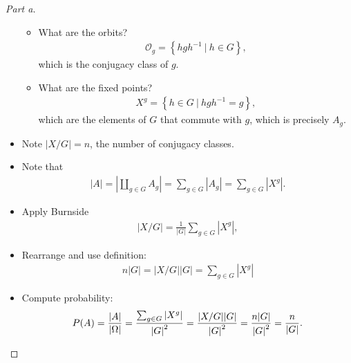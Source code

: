 \begin{solution}
\begin{proof}[Part a]
\begin{itemize}
  \begin{itemize}
  \item
    What are the orbits?
    \begin{align*}
    \mathcal{O}_g = \left\{{hgh^{-1}{~\mathrel{\Big|}~}h\in G}\right\}
    ,\end{align*}
    which is the conjugacy class of \(g\).
  \item
    What are the fixed points?
    \begin{align*}X^g = \left\{{h\in G {~\mathrel{\Big|}~}hgh^{-1}= g}\right\},\end{align*}
    which are the elements of \(G\) that commute with \(g\), which is
    precisely \(A_g\).
  \end{itemize}
\item
  Note \({\left\lvert {X/G} \right\rvert} = n\), the number of conjugacy
  classes.
\item
  Note that
  \begin{align*}
  {\left\lvert {A} \right\rvert} = {\left\lvert {{\coprod}_{g\in G} A_g} \right\rvert} = \sum_{g\in G} {\left\lvert {A_g} \right\rvert} = \sum_{g\in G}{\left\lvert {X^g} \right\rvert}
  .\end{align*}
\item
  Apply Burnside
  \begin{align*}
  {\left\lvert {X / G} \right\rvert} = \frac { 1 } { | G | } \sum _ { g \in G } \left| X ^ { g } \right|,
  \end{align*}
\item
  Rearrange and use definition:
  \begin{align*}
  n {\left\lvert {G} \right\rvert}
  = {\left\lvert {X/G} \right\rvert} {\left\lvert {G} \right\rvert}
  = \sum _ { g \in G } \left| X ^ { g } \right|
  \end{align*}
\item
  Compute probability:
  \begin{align*}
  P(A)
  = {{\left\lvert {A} \right\rvert} \over {\left\lvert {\Omega} \right\rvert}} 
  = \frac{\sum_{ g \in G } \left| X ^ { g } \right|}{{\left\lvert {G} \right\rvert}^2} 
  = \frac{{\left\lvert {X/G} \right\rvert}{\left\lvert {G} \right\rvert}}{{\left\lvert {G} \right\rvert}^2} 
  = \frac{n {\left\lvert {G} \right\rvert}}{{\left\lvert {G} \right\rvert}^2} 
  = \frac n {{\left\lvert {G} \right\rvert}}
  .\end{align*}
\end{itemize}

\end{proof}


\end{solution}
